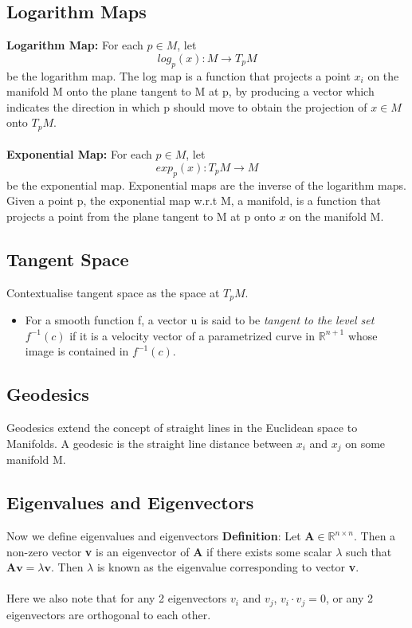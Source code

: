 \documentclass[12pt]{report}
\begin{document}
\newpage

\subsection{Logarithm Maps}
\textbf{Logarithm Map:} For each $p \in M$, let
$$log_p(x): M \longrightarrow T_pM$$
be the logarithm map. The log map is a function that projects a point $x_i$ on the manifold M onto the plane tangent to M at p, by producing a vector which indicates the direction in which p should move to obtain the projection of $x \in M$ onto $T_pM$.\\
\\
\textbf{Exponential Map:} For each $p \in M$, let
$$exp_p(x): T_pM \longrightarrow M$$
be the exponential map. Exponential maps are the inverse of the logarithm maps.
Given a point p, the exponential map w.r.t M, a manifold, is a function that projects a point from the plane tangent to M at p onto $x$ on the manifold M.\\

\subsection{Tangent Space}
Contextualise tangent space as the space at $T_pM$.
\begin{itemize}
    \item[] For a smooth function f, a vector u is said to be \textit{tangent to the level set} $f^{-1}(c)$ if it is a velocity vector of a parametrized curve in $\mathbb{R}^{n+1}$ whose image is contained in $f^{-1}(c)$.
\end{itemize}

\subsection{Geodesics}

Geodesics extend the concept of straight lines in the Euclidean space to Manifolds. A geodesic is the straight line distance between $x_i$ and $x_j$ on some manifold M.

\subsection{Eigenvalues and Eigenvectors}
Now we define eigenvalues and eigenvectors
\textbf{Definition}: Let $\textbf{A} \in \mathbb{R}^{n \times n}$. Then a non-zero vector \textbf{v} is an eigenvector of \textbf{A} if there exists some scalar $\lambda$ such that $\textbf{A}\textbf{v} = \lambda \textbf{v}$. Then $\lambda$ is known as the eigenvalue corresponding to vector \textbf{v}.\\
\\
Here we also note that for any 2 eigenvectors $v_i$ and $v_j$, $v_i \cdot v_j = 0$, or any 2 eigenvectors are orthogonal to each other.
\end{document}
